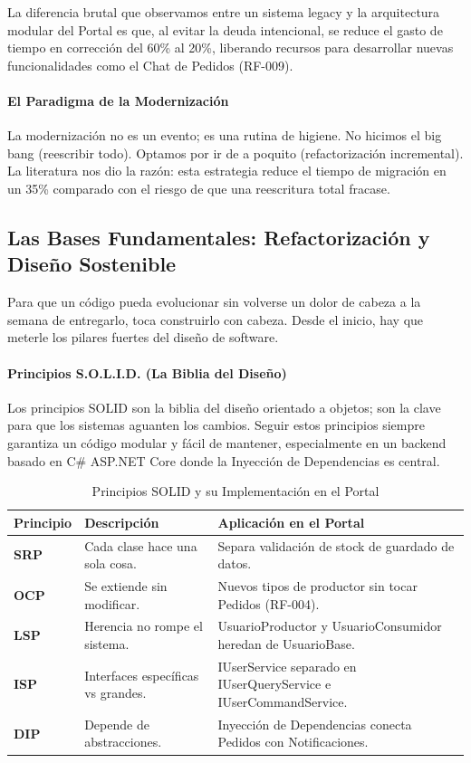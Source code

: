 La diferencia brutal que observamos entre un sistema legacy y la arquitectura modular del Portal es que, al evitar la deuda intencional, se reduce el gasto de tiempo en corrección del 60\% al 20\%, liberando recursos para desarrollar nuevas funcionalidades como el Chat de Pedidos (RF-009).

\paragraph{El Paradigma de la Modernización}

La modernización no es un evento; es una rutina de higiene. No hicimos el big bang (reescribir todo). Optamos por ir de a poquito (refactorización incremental). La literatura nos dio la razón: esta estrategia reduce el tiempo de migración en un 35\% comparado con el riesgo de que una reescritura total fracase.

\subsection{Las Bases Fundamentales: Refactorización y Diseño Sostenible}

Para que un código pueda evolucionar sin volverse un dolor de cabeza a la semana de entregarlo, toca construirlo con cabeza. Desde el inicio, hay que meterle los pilares fuertes del diseño de software.

\paragraph{Principios S.O.L.I.D. (La Biblia del Diseño)}

Los principios SOLID son la biblia del diseño orientado a objetos; son la clave para que los sistemas aguanten los cambios. Seguir estos principios siempre garantiza un código modular y fácil de mantener, especialmente en un backend basado en C\# ASP.NET Core donde la Inyección de Dependencias es central.

\begin{table}[htbp]
\centering
\small
\begin{tabular}{|p{2.2cm}|p{3.5cm}|p{4cm}|}
\hline
\textbf{Principio} & \textbf{Descripción} & \textbf{Aplicación en el Portal} \\
\hline
\textbf{SRP} & Cada clase hace una sola cosa. & Separa validación de stock de guardado de datos. \\
\hline
\textbf{OCP} & Se extiende sin modificar. & Nuevos tipos de productor sin tocar Pedidos (RF-004). \\
\hline
\textbf{LSP} & Herencia no rompe el sistema. & UsuarioProductor y UsuarioConsumidor heredan de UsuarioBase. \\
\hline
\textbf{ISP} & Interfaces específicas vs grandes. & IUserService separado en IUserQueryService e IUserCommandService. \\
\hline
\textbf{DIP} & Depende de abstracciones. & Inyección de Dependencias conecta Pedidos con Notificaciones. \\
\hline
\end{tabular}
\caption{Principios SOLID y su Implementación en el Portal}
\end{table}


